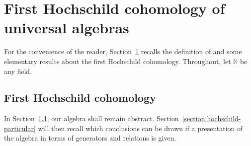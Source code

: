 \documentclass[10pt,a4paper]{amsart}
\numberwithin{equation}{section}
\newcommand{\thefield}{\mathbb{K}}
\begin{document}
\section{First Hochschild cohomology of universal algebras}
\label{section:hochschild}
For the convenience of the reader, Section~\ref{section:hochschild} recalls the definition of and some elementary results about the first Hochschild cohomology. Throughout, let $\thefield$ be any field.


\subsection{First Hochschild cohomology}
\label{section:hochschild-general}
In Section~\ref{section:hochschild-general}, our algebra shall remain abstract. Section~\ref{section:hochschild-particular} will then recall which conclusions can be drawn if a presentation of the algebra in terms of generators and relations is given.
\end{document}
